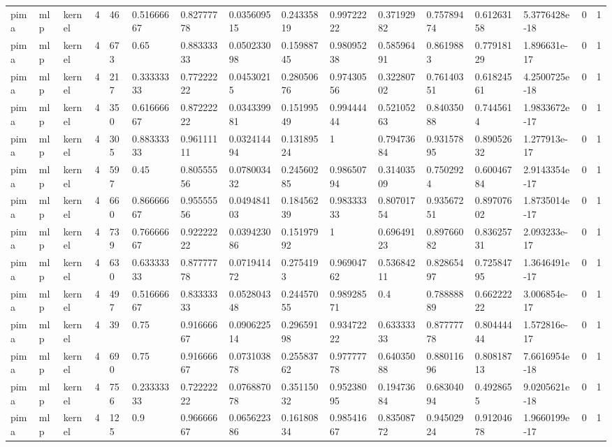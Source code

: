 \begin{tabular}{llllllllllllllll}
pima & mlp & kernel & 4 & 46 & 0.51666667 & 0.82777778 & 0.035609515 & 0.24335819 & 0.99722222 & 0.37192982 & 0.75789474 & 0.61263158 & 5.3776428e-18 & 0 & 1 \\
pima & mlp & kernel & 4 & 673 & 0.65 & 0.88333333 & 0.050233098 & 0.15988745 & 0.98095238 & 0.58596491 & 0.8619883 & 0.77918129 & 1.896631e-17 & 0 & 1 \\
pima & mlp & kernel & 4 & 217 & 0.33333333 & 0.77222222 & 0.04530215 & 0.28050676 & 0.97430556 & 0.32280702 & 0.76140351 & 0.61824561 & 4.2500725e-18 & 0 & 1 \\
pima & mlp & kernel & 4 & 350 & 0.61666667 & 0.87222222 & 0.034339981 & 0.15199549 & 0.99444444 & 0.52105263 & 0.84035088 & 0.7445614 & 1.9833672e-17 & 0 & 1 \\
pima & mlp & kernel & 4 & 305 & 0.88333333 & 0.96111111 & 0.032414494 & 0.13189524 & 1 & 0.79473684 & 0.93157895 & 0.89052632 & 1.277913e-17 & 0 & 1 \\
pima & mlp & kernel & 4 & 597 & 0.45 & 0.80555556 & 0.078003432 & 0.24560285 & 0.98650794 & 0.31403509 & 0.7502924 & 0.60046784 & 2.9143354e-17 & 0 & 1 \\
pima & mlp & kernel & 4 & 660 & 0.86666667 & 0.95555556 & 0.049484103 & 0.18456239 & 0.98333333 & 0.80701754 & 0.93567251 & 0.89707602 & 1.8735014e-17 & 0 & 1 \\
pima & mlp & kernel & 4 & 739 & 0.76666667 & 0.92222222 & 0.039423086 & 0.15197992 & 1 & 0.69649123 & 0.89766082 & 0.83625731 & 2.093233e-17 & 0 & 1 \\
pima & mlp & kernel & 4 & 630 & 0.63333333 & 0.87777778 & 0.071941472 & 0.2754193 & 0.96904762 & 0.53684211 & 0.82865497 & 0.72584795 & 1.3646491e-17 & 0 & 1 \\
pima & mlp & kernel & 4 & 497 & 0.51666667 & 0.83333333 & 0.052804348 & 0.24457055 & 0.98928571 & 0.4 & 0.78888889 & 0.66222222 & 3.006854e-17 & 0 & 1 \\
pima & mlp & kernel & 4 & 39 & 0.75 & 0.91666667 & 0.090622514 & 0.29659198 & 0.93472222 & 0.63333333 & 0.87777778 & 0.80444444 & 1.572816e-17 & 0 & 1 \\
pima & mlp & kernel & 4 & 690 & 0.75 & 0.91666667 & 0.073103878 & 0.25583762 & 0.97777778 & 0.64035088 & 0.88011696 & 0.80818713 & 7.6616954e-18 & 0 & 1 \\
pima & mlp & kernel & 4 & 756 & 0.23333333 & 0.72222222 & 0.076887078 & 0.35115032 & 0.95238095 & 0.19473684 & 0.68304094 & 0.4928655 & 9.0205621e-18 & 0 & 1 \\
pima & mlp & kernel & 4 & 125 & 0.9 & 0.96666667 & 0.065622386 & 0.16180834 & 0.98541667 & 0.83508772 & 0.94502924 & 0.91204678 & 1.9660199e-17 & 0 & 1 \\

\end{tabular}
